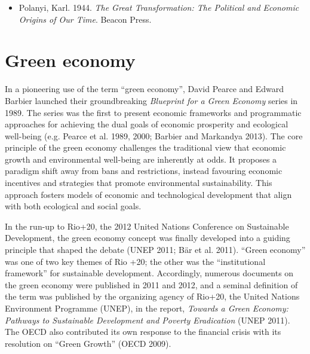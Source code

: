 \documentclass[
  a4paper,
  DIV=11,
  numbers=noendperiod,
  oneside,
  openany]{scrreprt}
\providecommand{\tightlist}{%
  \setlength{\itemsep}{0pt}\setlength{\parskip}{0pt}}
\begin{document}
\begin{tcolorbox}[enhanced jigsaw, arc=.35mm, bottomrule=.15mm, bottomtitle=1mm, breakable, colback=white, colbacktitle=quarto-callout-caution-color!10!white, colframe=quarto-callout-caution-color-frame, coltitle=black, left=2mm, leftrule=.75mm, opacityback=0, opacitybacktitle=0.6, rightrule=.15mm, title={Further reading}, titlerule=0mm, toprule=.15mm, toptitle=1mm]

\begin{itemize}
\tightlist
\item
  Polanyi, Karl. 1944. \emph{The Great Transformation: The Political and
  Economic Origins of Our Time}. Beacon Press.
\end{itemize}

\end{tcolorbox}

\section{Green economy}\label{green-economy}

In a pioneering use of the term ``green economy'', David Pearce and
Edward Barbier launched their groundbreaking \emph{Blueprint for a Green
Economy} series in 1989. The series was the first to present economic
frameworks and programmatic approaches for achieving the dual goals of
economic prosperity and ecological well-being (e.g. Pearce et al. 1989,
2000; Barbier and Markandya 2013). The core principle of the green
economy challenges the traditional view that economic growth and
environmental well-being are inherently at odds. It proposes a paradigm
shift away from bans and restrictions, instead favouring economic
incentives and strategies that promote environmental sustainability.
This approach fosters models of economic and technological development
that align with both ecological and social goals.

In the run-up to Rio+20, the 2012 United Nations Conference on
Sustainable Development, the green economy concept was finally developed
into a guiding principle that shaped the debate (UNEP 2011; Bär et al.
2011). ``Green economy'' was one of two key themes of Rio +20; the other
was the ``institutional framework'' for sustainable development.
Accordingly, numerous documents on the green economy were published in
2011 and 2012, and a seminal definition of the term was published by the
organizing agency of Rio+20, the United Nations Environment Programme
(UNEP), in the report, \emph{Towards a Green Economy: Pathways to
Sustainable Development and Poverty Eradication} (UNEP 2011). The OECD
also contributed its own response to the financial crisis with its
resolution on ``Green Growth'' (OECD 2009).
\end{document}
